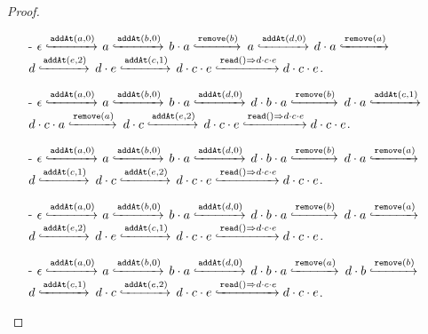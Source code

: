 \begin {proof}
\begin{itemize}
\item[-] $\epsilon \specarrow{\alabelshort[\mathtt{addAt}]{a,0}}$ $a \specarrow{\alabelshort[\mathtt{addAt}]{b,0}}$ $b \cdot a \specarrow{\alabelshort[\mathtt{remove}]{b}}$ $a \specarrow{\alabelshort[\mathtt{addAt}]{d,0}}$ $d \cdot a \specarrow{\alabelshort[\mathtt{remove}]{a}}$ $d \specarrow{\alabelshort[\mathtt{addAt}]{e,2}}$ $d \cdot e \specarrow{\alabelshort[\mathtt{addAt}]{c,1}}$ $d \cdot c \cdot e \specarrow{\alabellong[\mathtt{read}]{}{d \cdot c \cdot e}{}} d \cdot c \cdot e$.

\item[-] $\epsilon \specarrow{\alabelshort[\mathtt{addAt}]{a,0}}$ $a \specarrow{\alabelshort[\mathtt{addAt}]{b,0}}$ $b \cdot a \specarrow{\alabelshort[\mathtt{addAt}]{d,0}}$ $d \cdot b \cdot a \specarrow{\alabelshort[\mathtt{remove}]{b}}$ $d \cdot a \specarrow{\alabelshort[\mathtt{addAt}]{c,1}}$ $d \cdot c \cdot a \specarrow{\alabelshort[\mathtt{remove}]{a}}$ $d \cdot c \specarrow{\alabelshort[\mathtt{addAt}]{e,2}}$ $d \cdot c \cdot e \specarrow{\alabellong[\mathtt{read}]{}{d \cdot c \cdot e}{}} d \cdot c \cdot e$.

\item[-] $\epsilon \specarrow{\alabelshort[\mathtt{addAt}]{a,0}}$ $a \specarrow{\alabelshort[\mathtt{addAt}]{b,0}}$ $b \cdot a \specarrow{\alabelshort[\mathtt{addAt}]{d,0}}$ $d \cdot b \cdot a \specarrow{\alabelshort[\mathtt{remove}]{b}}$ $d \cdot a \specarrow{\alabelshort[\mathtt{remove}]{a}}$ $d \specarrow{\alabelshort[\mathtt{addAt}]{c,1}}$ $d \cdot c \specarrow{\alabelshort[\mathtt{addAt}]{e,2}}$ $d \cdot c \cdot e \specarrow{\alabellong[\mathtt{read}]{}{d \cdot c \cdot e}{}} d \cdot c \cdot e$.

\item[-] $\epsilon \specarrow{\alabelshort[\mathtt{addAt}]{a,0}}$ $a \specarrow{\alabelshort[\mathtt{addAt}]{b,0}}$ $b \cdot a \specarrow{\alabelshort[\mathtt{addAt}]{d,0}}$ $d \cdot b \cdot a \specarrow{\alabelshort[\mathtt{remove}]{b}}$ $d \cdot a \specarrow{\alabelshort[\mathtt{remove}]{a}}$ $d \specarrow{\alabelshort[\mathtt{addAt}]{e,2}}$ $d \cdot e \specarrow{\alabelshort[\mathtt{addAt}]{c,1}}$ $d \cdot c \cdot e \specarrow{\alabellong[\mathtt{read}]{}{d \cdot c \cdot e}{}} d \cdot c \cdot e$.

\item[-] $\epsilon \specarrow{\alabelshort[\mathtt{addAt}]{a,0}}$ $a \specarrow{\alabelshort[\mathtt{addAt}]{b,0}}$ $b \cdot a \specarrow{\alabelshort[\mathtt{addAt}]{d,0}}$ $d \cdot b \cdot a \specarrow{\alabelshort[\mathtt{remove}]{a}}$ $d \cdot b \specarrow{\alabelshort[\mathtt{remove}]{b}}$ $d \specarrow{\alabelshort[\mathtt{addAt}]{c,1}}$ $d \cdot c \specarrow{\alabelshort[\mathtt{addAt}]{e,2}}$ $d \cdot c \cdot e \specarrow{\alabellong[\mathtt{read}]{}{d \cdot c \cdot e}{}} d \cdot c \cdot e$.


\end{itemize}
\end{proof}
